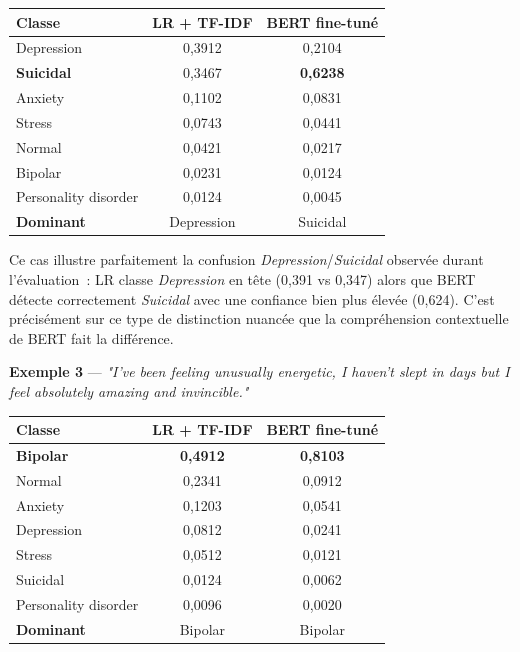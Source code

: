 \documentclass[12pt,a4paper]{report}
\begin{document}
\begin{center}
\begin{tabular}{@{}lcc@{}}
\toprule
\textbf{Classe} & \textbf{LR + TF-IDF} & \textbf{BERT fine-tuné} \\
\midrule
Depression             & 0,3912          & 0,2104 \\
\textbf{Suicidal}      & 0,3467          & \textbf{0,6238} \\
Anxiety                & 0,1102          & 0,0831 \\
Stress                 & 0,0743          & 0,0441 \\
Normal                 & 0,0421          & 0,0217 \\
Bipolar                & 0,0231          & 0,0124 \\
Personality disorder   & 0,0124          & 0,0045 \\
\midrule
\textbf{Dominant} & Depression & Suicidal \\
\bottomrule
\end{tabular}
\end{center}

\begin{note}[Interprétation]
Ce cas illustre parfaitement la confusion \textit{Depression}/\textit{Suicidal} observée
durant l'évaluation~: LR classe \textit{Depression} en tête (0,391 vs 0,347) alors que
BERT détecte correctement \textit{Suicidal} avec une confiance bien plus élevée (0,624).
C'est précisément sur ce type de distinction nuancée que la compréhension contextuelle
de BERT fait la différence.
\end{note}

\bigskip

\textbf{Exemple 3} — \textit{"I've been feeling unusually energetic, I haven't slept in
days but I feel absolutely amazing and invincible."}

\begin{center}
\begin{tabular}{@{}lcc@{}}
\toprule
\textbf{Classe} & \textbf{LR + TF-IDF} & \textbf{BERT fine-tuné} \\
\midrule
\textbf{Bipolar}       & \textbf{0,4912} & \textbf{0,8103} \\
Normal                 & 0,2341          & 0,0912 \\
Anxiety                & 0,1203          & 0,0541 \\
Depression             & 0,0812          & 0,0241 \\
Stress                 & 0,0512          & 0,0121 \\
Suicidal               & 0,0124          & 0,0062 \\
Personality disorder   & 0,0096          & 0,0020 \\
\midrule
\textbf{Dominant} & Bipolar & Bipolar \\
\bottomrule
\end{tabular}
\end{center}
\end{document}
